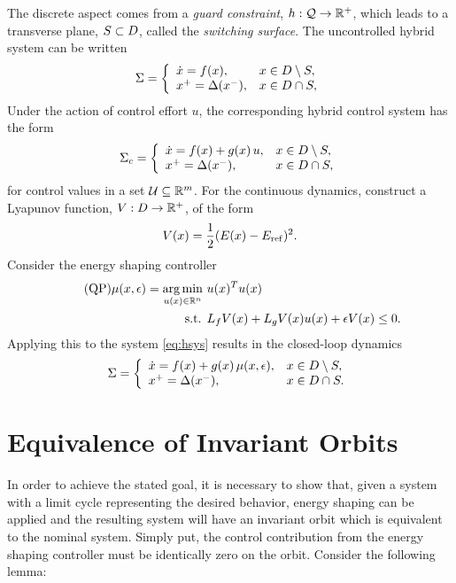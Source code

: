 \documentclass[twocolumn]{article}
\begin{document}
The discrete aspect comes from a {\em guard constraint}, $h : \mathcal{Q} \to \mathbb{R}^{+}$, which leads to a transverse plane, $S \subset D$, called the {\em switching surface}.
%
The uncontrolled hybrid system can be written
\begin{align}
  \Sigma = \left\{
  \begin{array}{l l}
    {\dot x} = f(x), & x \in D \setminus S,\\
    x^{+} = \Delta(x^{-}), &x \in D \cap S,
  \end{array}\right.
  \label{eq:hsys}
\end{align}
Under the action of control effort $u$, the corresponding hybrid control system has the form
\begin{align}
  \Sigma_{c} = \left\{
  \begin{array}{l l}
    {\dot x} = f(x) + g(x) \, u, & x \in D \setminus S,\\
    x^{+} = \Delta(x^{-}), &x \in D \cap S,
  \end{array}\right.
  \label{eq:csys}
\end{align}
for control values in a set $\mathcal{U} \subseteq \mathbb{R}^{m}$.
%
For the continuous dynamics, construct a Lyapunov function, $V : D \to \mathbb{R}^{+}$, of the form
\begin{align}
  \label{eq:lyap}
  V(x) = \frac{1}{2} (E(x) - E_{\mathrm{ref}})^2.
\end{align}
Consider the energy shaping controller
\begin{align}
  \label{eq:es-qp} \tag {QP}
  \mu(x, \epsilon) = \operatorname*{arg\,min}_{u(x) \in \mathbb{R}^{n}} \ & u(x)^T u(x)\\
  \nonumber
  \mbox{s.t. } & L_{f} V(x) + L_{g} V(x) u(x) + \epsilon V(x) \leq 0.
\end{align}
Applying this to the system \eqref{eq:hsys} results in the closed-loop dynamics
\begin{align}
  \label{eq:hsys-cl}
  \Sigma = \left\{
  \begin{array}{l l}
    {\dot x} = f(x) + g(x) \, \mu(x, \epsilon), & x \in D \setminus S,\\
    x^{+} = \Delta(x^{-}), &x \in D \cap S.
  \end{array}\right.
\end{align}

\section{Equivalence of Invariant Orbits}
In order to achieve the stated goal, it is necessary to show that, given a system with a limit cycle representing the desired behavior, energy shaping can be applied and the resulting system will have an invariant orbit which is equivalent to the nominal system. Simply put, the control contribution from the energy shaping controller must be identically zero on the orbit. Consider the following lemma:
\end{document}
